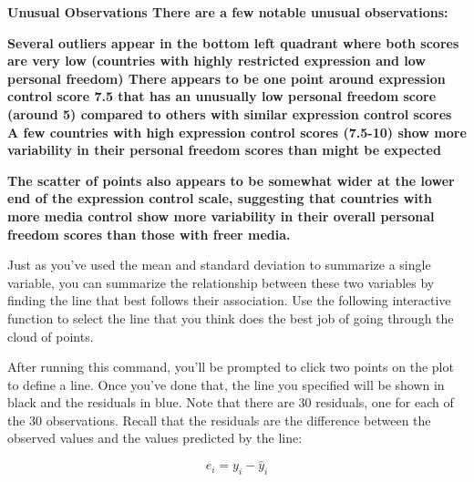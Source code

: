 \documentclass[
]{article}
\newenvironment{Shaded}{\begin{snugshade}}{\end{snugshade}}
\newcommand{\AttributeTok}[1]{\textcolor[rgb]{0.13,0.29,0.53}{#1}}
\newcommand{\CommentTok}[1]{\textcolor[rgb]{0.56,0.35,0.01}{\textit{#1}}}
\newcommand{\FunctionTok}[1]{\textcolor[rgb]{0.13,0.29,0.53}{\textbf{#1}}}
\newcommand{\NormalTok}[1]{#1}
\newcommand{\OtherTok}[1]{\textcolor[rgb]{0.56,0.35,0.01}{#1}}
\newcommand{\SpecialCharTok}[1]{\textcolor[rgb]{0.81,0.36,0.00}{\textbf{#1}}}
\begin{document}
\textbf{Unusual Observations There are a few notable unusual
observations:}

\textbf{Several outliers appear in the bottom left quadrant where both
scores are very low (countries with highly restricted expression and low
personal freedom) There appears to be one point around expression
control score 7.5 that has an unusually low personal freedom score
(around 5) compared to others with similar expression control scores A
few countries with high expression control scores (7.5-10) show more
variability in their personal freedom scores than might be expected}

\textbf{The scatter of points also appears to be somewhat wider at the
lower end of the expression control scale, suggesting that countries
with more media control show more variability in their overall personal
freedom scores than those with freer media.}

Just as you've used the mean and standard deviation to summarize a
single variable, you can summarize the relationship between these two
variables by finding the line that best follows their association. Use
the following interactive function to select the line that you think
does the best job of going through the cloud of points.

\begin{Shaded}
\end{Shaded}

After running this command, you'll be prompted to click two points on
the plot to define a line. Once you've done that, the line you specified
will be shown in black and the residuals in blue. Note that there are 30
residuals, one for each of the 30 observations. Recall that the
residuals are the difference between the observed values and the values
predicted by the line:

\[ e_i = y_i - \hat{y}_i \]
\end{document}
